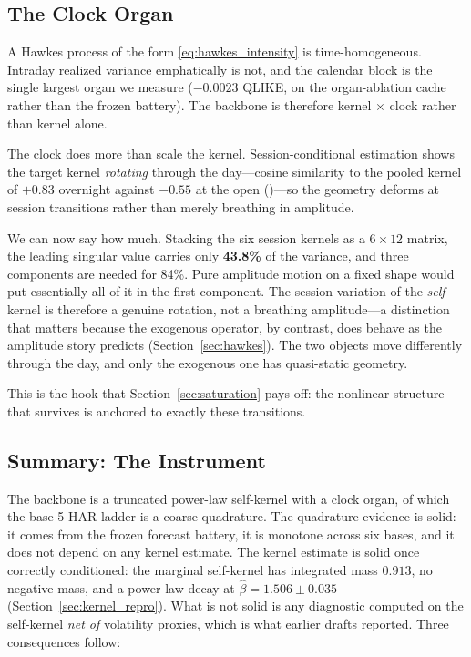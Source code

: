 \subsection{The Clock Organ}
\label{sec:clock}

A Hawkes process of the form \eqref{eq:hawkes_intensity} is time-homogeneous.
Intraday realized variance emphatically is not, and the calendar block is the
single largest organ we measure ($-0.0023$ QLIKE, on the organ-ablation cache
rather than the frozen battery). The backbone is therefore
kernel $\times$ clock rather than kernel alone.

The clock does more than scale the kernel. Session-conditional estimation shows
the target kernel \emph{rotating} through the day---cosine similarity to the
pooled kernel of $+0.83$ overnight against $-0.55$ at the open
()---so the geometry deforms at session
transitions rather than merely breathing in amplitude.

We can now say how much. Stacking the six session kernels as a $6 \times 12$
matrix, the leading singular value carries only \textbf{43.8\%} of the
variance, and three components are needed for 84\%. Pure amplitude motion on a
fixed shape would put essentially all of it in the first component. The session
variation of the \emph{self}-kernel is therefore a genuine rotation, not a
breathing amplitude---a distinction that matters because the exogenous
operator, by contrast, does behave as the amplitude story predicts
(Section~\ref{sec:hawkes}). The two objects move differently through the day,
and only the exogenous one has quasi-static geometry.

This is the hook that Section~\ref{sec:saturation} pays off: the nonlinear
structure that survives is anchored to exactly these transitions.

\subsection{Summary: The Instrument}
\label{sec:backbone_summary}

The backbone is a truncated power-law self-kernel with a clock organ, of which
the base-5 HAR ladder is a coarse quadrature. The quadrature evidence is
solid: it comes from the frozen forecast battery, it is monotone across six
bases, and it does not depend on any kernel estimate. The kernel estimate is
solid once correctly conditioned: the marginal self-kernel has integrated mass
$0.913$, no negative mass, and a power-law decay at
$\hat\beta = 1.506 \pm 0.035$ (Section~\ref{sec:kernel_repro}). What is not
solid is any diagnostic computed on the self-kernel \emph{net of} volatility
proxies, which is what earlier drafts reported. Three consequences follow:

